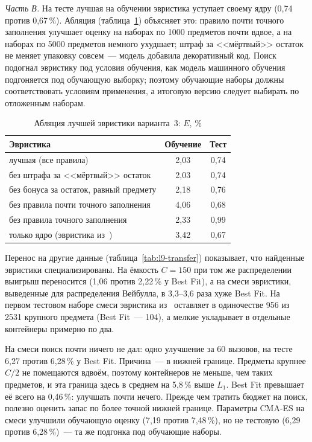 \emph{Часть В.} На тесте лучшая на обучении эвристика уступает своему ядру (0,74 против 0,67\,\%).
Абляция (таблица~\ref{tab:l9-ablation}) объясняет это: правило почти точного заполнения улучшает
оценку на наборах по 1000 предметов почти вдвое, а на наборах по 5000 предметов немного ухудшает;
штраф за <<мёртвый>> остаток не меняет упаковку совсем~--- модель добавила декоративный код.
Поиск подогнал эвристику под условия обучения, как модель машинного обучения подгоняется под обучающую
выборку; поэтому обучающие наборы должны соответствовать условиям применения, а итоговую версию
следует выбирать по отложенным наборам.

\begin{table}[!htb]
\caption{Абляция лучшей эвристики варианта~3: $E$, \%}
\label{tab:l9-ablation}
\centering\small
\begin{tabular}{lcc}
\toprule
Эвристика & Обучение & Тест \\
\midrule
лучшая (все правила) & 2,03 & 0,74 \\
без штрафа за <<мёртвый>> остаток & 2,03 & 0,74 \\
без бонуса за остаток, равный предмету & 2,18 & 0,76 \\
без правила почти точного заполнения & 4,06 & 0,68 \\
без правила точного заполнения & 2,33 & 0,99 \\
только ядро (эвристика из~\cite{romera2024}) & 3,42 & 0,67 \\
\bottomrule
\end{tabular}
\end{table}

Перенос на другие данные (таблица~\ref{tab:l9-transfer}) показывает, что найденные эвристики
специализированы. На ёмкость $C = 150$ при том же распределении выигрыш переносится (1,06 против
2,22\,\% у Best Fit), а на смеси эвристики, выведенные для распределения Вейбулла, в 3,3--3,6 раза
хуже Best Fit. На первом тестовом наборе смеси эвристика из~\cite{romera2024} оставляет в одиночестве
956 из 2531 крупного предмета (Best Fit~--- 104), а мелкие укладывает в отдельные контейнеры примерно
по два.

На смеси поиск почти ничего не дал: одно улучшение за 60 вызовов, на тесте 6,27 против 6,28\,\% у
Best Fit. Причина~--- в нижней границе. Предметы крупнее $C/2$ не помещаются вдвоём, поэтому
контейнеров не меньше, чем таких предметов, и эта граница здесь в среднем на 5,8\,\% выше $L_1$. Best Fit
превышает её всего на 0,46\,\%: улучшать почти нечего. Прежде чем тратить бюджет на поиск, полезно
оценить запас по более точной нижней границе. Параметры CMA-ES на смеси улучшили обучающую оценку
(7,19 против 7,48\,\%), но не тестовую (6,29 против 6,28\,\%)~--- та же подгонка под обучающие наборы.

